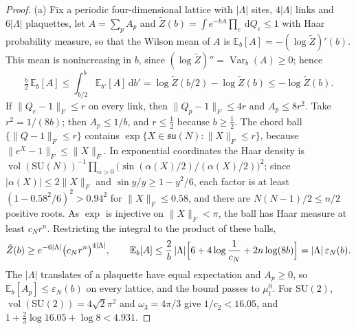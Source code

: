 \documentclass[11pt,a4paper]{amsart}
\theoremstyle{definition}
\theoremstyle{remark}
\numberwithin{equation}{section}
\DeclareMathOperator{\Var}{Var}      %
\newcommand{\norm}[1]{\lVert #1\rVert}     %
\newcommand{\abs}[1]{\lvert #1\rvert}      %
\newcommand{\dd}{\,\mathrm{d}}             %
\newcommand{\SU}{\mathrm{SU}}              %
\begin{document}
\begin{proof}
(a) Fix a periodic four-dimensional lattice with $\abs\Lambda$ sites, $4\abs\Lambda$ links and $6\abs\Lambda$ plaquettes, let $A=\sum_pA_p$ and $\tilde Z(b)=\int e^{-bA}\prod_e\dd Q_e\le1$ with Haar probability measure, so that the Wilson mean of $A$ is $\mathbb E_b[A]=-(\log\tilde Z)'(b)$. This mean is nonincreasing in $b$, since $(\log\tilde Z)''=\Var_b(A)\ge0$; hence
\[
\tfrac b2\,\mathbb E_b[A]\le\int_{b/2}^b\mathbb E_{b'}[A]\dd b'=\log\tilde Z(b/2)-\log\tilde Z(b)\le-\log\tilde Z(b).
\]
If $\norm{Q_e-1}_F\le r$ on every link, then $\norm{Q_p-1}_F\le4r$ and $A_p\le8r^2$. Take $r^2=1/(8b)$; then $A_p\le1/b$, and $r\le\frac12$ because $b\ge\frac12$. The chord ball $\{\norm{Q-1}_F\le r\}$ contains $\exp\{X\in\mathfrak{su}(N):\norm X_F\le r\}$, because $\norm{e^X-1}_F\le\norm X_F$. In exponential coordinates the Haar density is $\operatorname{vol}(\SU(N))^{-1}\prod_{\alpha>0}\bigl(\sin(\alpha(X)/2)/(\alpha(X)/2)\bigr)^2$; since $\abs{\alpha(X)}\le2\norm X_F$ and $\sin y/y\ge1-y^2/6$, each factor is at least $(1-0.58^2/6)^2>0.94^2$ for $\norm X_F\le0.58$, and there are $N(N-1)/2\le n/2$ positive roots. As $\exp$ is injective on $\norm X_F<\pi$, the ball has Haar measure at least $c_Nr^n$. Restricting the integral to the product of these balls,
\[
\tilde Z(b)\ge e^{-6\abs\Lambda}\bigl(c_Nr^n\bigr)^{4\abs\Lambda},\qquad\mathbb E_b[A]\le\frac2b\,\abs\Lambda\Bigl[6+4\log\frac1{c_N}+2n\log(8b)\Bigr]=\abs\Lambda\,\varepsilon_N(b).
\]
The $\abs\Lambda$ translates of a plaquette have equal expectation and $A_p\ge0$, so $\mathbb E_b[A_p]\le\varepsilon_N(b)$ on every lattice, and the bound passes to $\mu^0_t$. For $\SU(2)$, $\operatorname{vol}(\SU(2))=4\sqrt2\pi^2$ and $\omega_3=4\pi/3$ give $1/c_2<16.05$, and $1+\frac23\log16.05+\log8<4.931$.


\end{proof}
\end{document}
